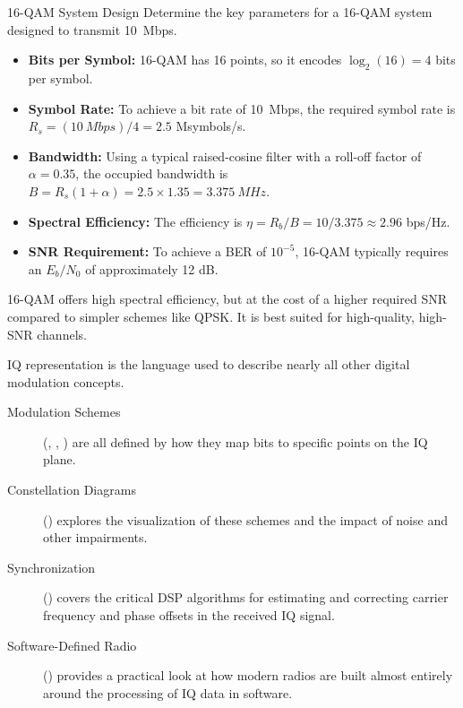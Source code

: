 \begin{workedexample}{16-QAM System Design}
     Determine the key parameters for a 16-QAM system designed to transmit \qty{10}{Mbps}.
    \begin{itemize}
        \item \textbf{Bits per Symbol:} 16-QAM has 16 points, so it encodes $\log_2(16) = 4$ bits per symbol.
        \item \textbf{Symbol Rate:} To achieve a bit rate of \qty{10}{Mbps}, the required symbol rate is $R_s = (\qty{10}{Mbps}) / 4 = 2.5$ Msymbols/s.
        \item \textbf{Bandwidth:} Using a typical raised-cosine filter with a roll-off factor of $\alpha = 0.35$, the occupied bandwidth is $B = R_s(1 + \alpha) = 2.5 \times 1.35 = \qty{3.375}{MHz}$.
        \item \textbf{Spectral Efficiency:} The efficiency is $\eta = R_b / B = 10 / 3.375 \approx 2.96$ bps/Hz.
        \item \textbf{SNR Requirement:} To achieve a BER of $10^{-5}$, 16-QAM typically requires an $E_b/N_0$ of approximately 12 dB.
    \end{itemize}
     16-QAM offers high spectral efficiency, but at the cost of a higher required SNR compared to simpler schemes like QPSK. It is best suited for high-quality, high-SNR channels.
\end{workedexample}

\begin{importantbox}[title={Further Reading}]
    IQ representation is the language used to describe nearly all other digital modulation concepts.
    \begin{description}
        \item[Modulation Schemes] (, , ) are all defined by how they map bits to specific points on the IQ plane.
        \item[Constellation Diagrams] () explores the visualization of these schemes and the impact of noise and other impairments.
        \item[Synchronization] () covers the critical DSP algorithms for estimating and correcting carrier frequency and phase offsets in the received IQ signal.
        \item[Software-Defined Radio] () provides a practical look at how modern radios are built almost entirely around the processing of IQ data in software.
    \end{description}
\end{importantbox}
